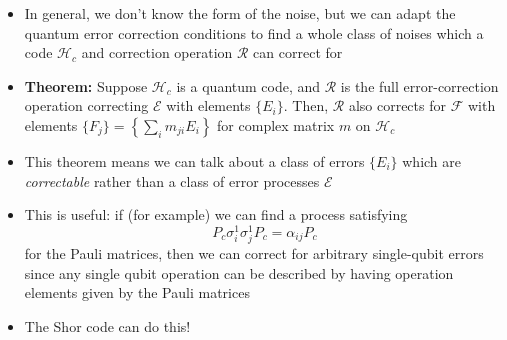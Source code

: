 \documentclass[12pt,a4paper]{article}
\numberwithin{equation}{section}
\begin{document}
\begin{itemize}
		\item In general, we don't know the form of the noise, but we can adapt the quantum error correction conditions to find a whole class of noises which a code $\mathcal{H}_{c}$ and correction operation $\mathcal{R}$ can correct for
		\item \textbf{Theorem:} Suppose $\mathcal{H}_{c}$ is a quantum code, and $\mathcal{R}$ is the full error-correction operation correcting $\mathcal{E}$ with elements $\{E_{i}\}$. Then, $\mathcal{R}$ also corrects for $\mathcal{F}$ with elements $\{F_{j}\}=\left\{\sum_{i}m_{ji}E_{i}\right\}$ for complex matrix $m$ on $\mathcal{H}_{c}$
		\item This theorem means we can talk about a class of errors $\{E_{i}\}$ which are \textit{correctable} rather than a class of error processes $\mathcal{E}$
		\item This is useful: if (for example) we can find a process satisfying
		$$
			P_{c}\sigma_{i}^{1}\sigma_{j}^{1}P_{c}=\alpha_{ij}P_{c}
		$$
		for the Pauli matrices, then we can correct for arbitrary single-qubit errors since any single qubit operation can be described by having operation elements given by the Pauli matrices
		\item The Shor code can do this!
	\end{itemize}
\end{document}
